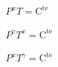 



\begin{enonce}
$P^xT=\mathrm{C^{te}}$
\end{enonce}





\begin{enonce}
$P^\gamma T^x=\mathrm{C^{te}}$
\end{enonce}





\begin{enonce}
$P^xT^\gamma=\mathrm{C^{te}}$
\end{enonce}




\finEntrainement





